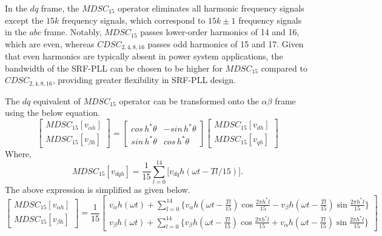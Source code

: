 In the $dq$ frame, the $MDSC_{15}$ operator eliminates all harmonic frequency signals except the $15k$ frequency signals, which correspond to $15k\pm1$ frequency signals in the $abc$ frame. Notably, $MDSC_{15}$ passes lower-order harmonics of 14 and 16, which are even, whereas $CDSC_{2,4,8,16}$ passes odd harmonics of 15 and 17. Given that even harmonics are typically absent in power system applications, the bandwidth of the SRF-PLL can be chosen to be higher for $MDSC_{15}$ compared to $CDSC_{2,4,8,16}$, providing greater flexibility in SRF-PLL design.

The $dq$ equivalent of $MDSC_{15}$ operator can be transformed onto the $\alpha\beta$ frame using the below equation. 
\begin{equation} \label{3.27} 
	\begin{bmatrix}
		MDSC_{15}[ v_{\alpha h} ]\\
		MDSC_{15}[ v_{\beta h} ]
	\end{bmatrix}
	= 
	\begin{bmatrix}
		cos \,h^{*}\theta & -sin \,h^{*}\theta\\
		sin \,h^{*}\theta & cos \,h^{*}\theta
	\end{bmatrix}
	\begin{bmatrix}
		MDSC_{15}[ v_{dh} ]\\
		MDSC_{15}[ v_{qh} ]
	\end{bmatrix}
\end{equation} 
Where, $$MDSC_{15}[ v_{dqh} ] = \frac{1}{15} \sum_{l=0}^{14} \big[ v_{dq} h( \omega t-Tl/15 ) \big].$$
The above expression is simplified as given below. 
\begin{equation} \label{3.28} 
\begin{bmatrix}
MDSC_{15}[ v_{\alpha h} ] \\%
MDSC_{15}[ v_{\beta h} ]
\end{bmatrix}
= \frac{1}{15}
\begin{bmatrix}
v_{\alpha} h(\omega t) + \sum\limits_{l=0}^{14} \Big\{v_{\alpha} h(\omega t - \frac{Tl}{15}) \cos \frac{2\pi h^{*}l} { 15 }  - v_{\beta} h(\omega t - \frac{Tl}{15}) \sin \frac{2\pi h^{*}l} { 15 } \Big\}  \\ %
v_{\beta} h(\omega t) + \sum\limits_{l=0}^{14} \Big\{ v_{\beta} h(\omega t - \frac{Tl}{15}) \cos \frac{2\pi h^{*}l} { 15 } + v_{\alpha} h(\omega t - \frac{Tl}{15}) \sin \frac{2\pi h^{*}l} { 15 } \Big\}
\end{bmatrix}
\end{equation}

